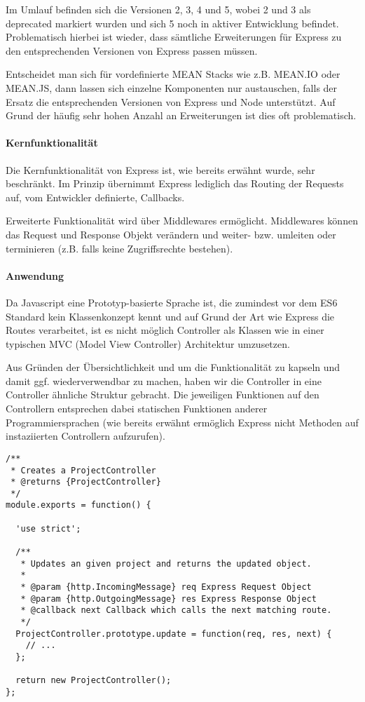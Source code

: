 Im Umlauf befinden sich die Versionen 2, 3, 4 und 5, wobei 2 und 3 als
deprecated markiert wurden und sich 5 noch in aktiver Entwicklung
befindet. Problematisch hierbei ist wieder, dass sämtliche Erweiterungen
für Express zu den entsprechenden Versionen von Express passen müssen.

Entscheidet man sich für vordefinierte MEAN Stacks wie z.B. MEAN.IO oder
MEAN.JS, dann lassen sich einzelne Komponenten nur austauschen, falls
der Ersatz die entsprechenden Versionen von Express und Node
unterstützt. Auf Grund der häufig sehr hohen Anzahl an Erweiterungen ist
dies oft problematisch.

\paragraph{Kernfunktionalität}\label{kernfunktionalituxe4t}

Die Kernfunktionalität von Express ist, wie bereits erwähnt wurde, sehr
beschränkt. Im Prinzip übernimmt Express lediglich das Routing der
Requests auf, vom Entwickler definierte, Callbacks.

Erweiterte Funktionalität wird über Middlewares ermöglicht. Middlewares
können das Request und Response Objekt verändern und weiter- bzw.
umleiten oder terminieren (z.B. falls keine Zugriffsrechte bestehen).

\paragraph{Anwendung}\label{anwendung}

Da Javascript eine Prototyp-basierte Sprache ist, die zumindest vor dem
ES6 Standard kein Klassenkonzept kennt und auf Grund der Art wie Express
die Routes verarbeitet, ist es nicht möglich Controller als Klassen wie
in einer typischen MVC (Model View Controller) Architektur umzusetzen.

Aus Gründen der Übersichtlichkeit und um die Funktionalität zu kapseln
und damit ggf. wiederverwendbar zu machen, haben wir die Controller in
eine Controller ähnliche Struktur gebracht. Die jeweiligen Funktionen
auf den Controllern entsprechen dabei statischen Funktionen anderer
Programmiersprachen (wie bereits erwähnt ermöglich Express nicht
Methoden auf instaziierten Controllern aufzurufen).

\begin{verbatim}
/**
 * Creates a ProjectController
 * @returns {ProjectController}
 */
module.exports = function() {

  'use strict';

  /**
   * Updates an given project and returns the updated object.
   *
   * @param {http.IncomingMessage} req Express Request Object
   * @param {http.OutgoingMessage} res Express Response Object
   * @callback next Callback which calls the next matching route.
   */
  ProjectController.prototype.update = function(req, res, next) {
    // ...
  };

  return new ProjectController();
};
\end{verbatim}

